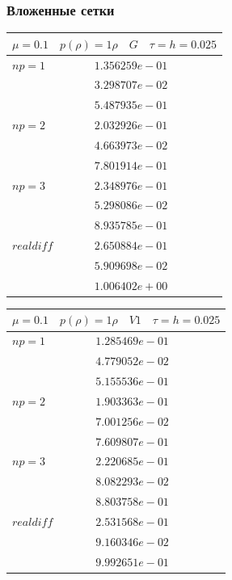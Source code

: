 \documentclass[a4paper,12pt]{extarticle}
\begin{document}
\subsubsection{Вложенные сетки}

\begin{tabular}{|l|l|}
	\hline
	\multicolumn{2}{|c|}{$\mu =0.1 \quad  p(\rho) =1 \rho \quad G \quad\tau = h = 0.025$}\\
	\hline
	$ np = 1$  & $1.356259e-01$\\
	& $3.298707e-02$\\
	& $5.487935e-01$\\
	\hline
	$ np = 2$  & $2.032926e-01$\\
	& $4.663973e-02$\\
	& $7.801914e-01$\\
	\hline
	$ np = 3$  & $2.348976e-01$\\
	& $5.298086e-02$\\
	& $8.935785e-01$\\
	\hline
	$ real diff $  & $2.650884e-01$\\
	& $5.909698e-02$\\
	& $1.006402e+00$\\
	\hline
\end{tabular}

\begin{tabular}{|l|l|}
	\hline
	\multicolumn{2}{|c|}{$\mu =0.1 \quad  p(\rho) =1 \rho \quad V1 \quad\tau = h = 0.025$}\\
	\hline
	$ np = 1$  & $1.285469e-01$\\
	& $4.779052e-02$\\
	& $5.155536e-01$\\
	\hline
	$ np = 2$  & $1.903363e-01$\\
	& $7.001256e-02$\\
	& $7.609807e-01$\\
	\hline
	$ np = 3$  & $2.220685e-01$\\
	& $8.082293e-02$\\
	& $8.803758e-01$\\
	\hline
	$ real diff $  & $2.531568e-01$\\
	& $9.160346e-02$\\
	& $9.992651e-01$\\
	\hline
\end{tabular}
\end{document}
